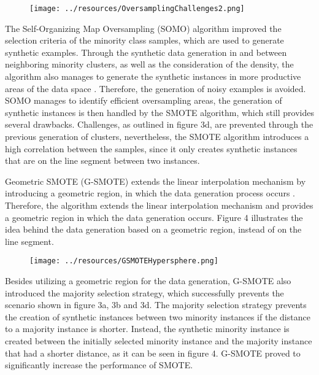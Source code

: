 \documentclass[parskip=full]{scrartcl}
\begin{document}
\begin{figure}[H]
	\centering
	\texttt{[image: ../resources/OversamplingChallenges2.png]}
\end{figure}

The Self-Organizing Map Oversampling (SOMO) algorithm improved the selection criteria of the minority class samples, which are used to generate synthetic examples. Through the synthetic data generation in and between neighboring minority clusters, as well as the consideration of the density, the algorithm also manages to generate the synthetic instances in more productive areas of the data space \cite{Douzas2017B}. Therefore, the generation of noisy examples is avoided. SOMO manages to identify efficient oversampling areas, the generation of synthetic instances is then handled by the SMOTE algorithm, which still provides several drawbacks. Challenges, as outlined in figure 3d, are prevented through the previous generation of clusters, nevertheless, the SMOTE algorithm introduces a high correlation between the samples, since it only creates synthetic instances that are on the line segment between two instances.

Geometric SMOTE (G-SMOTE) extends the linear interpolation mechanism by introducing a geometric region, in which the data generation process occurs \cite{Douzas2017}. Therefore, the algorithm extends the linear interpolation mechanism and provides a geometric region in which the data generation occurs. Figure 4 illustrates the idea behind the data generation based on a geometric region, instead of on the line segment. 

\begin{figure}[H]
	\centering
	\texttt{[image: ../resources/GSMOTEHypersphere.png]}
\end{figure}

Besides utilizing a geometric region for the data generation, G-SMOTE also introduced the majority selection strategy, which successfully prevents the scenario shown in figure 3a, 3b and 3d. The majority selection strategy prevents the creation of synthetic instances between two minority instances if the distance to a majority instance is shorter. Instead, the synthetic minority instance is created between the initially selected minority instance and the majority instance that had a shorter distance, as it can be seen in figure 4. G-SMOTE proved to significantly increase the performance of SMOTE. 
\end{document}
